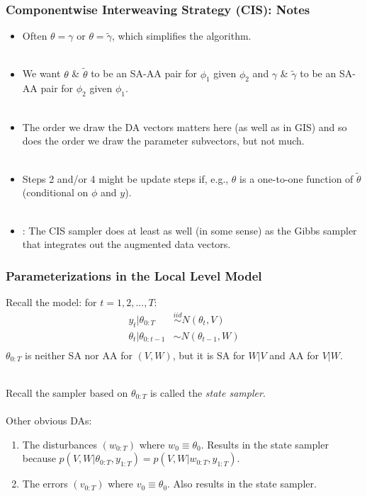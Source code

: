 \documentclass[xcolor=dvipsnames]{beamer}\usepackage{graphicx, color}
\begin{document}
\begin{frame}
  \frametitle{Componentwise Interweaving Strategy (CIS): Notes}
\begin{itemize}
  \item Often $\theta=\gamma$ or $\theta=\tilde{\gamma}$, which simplifies the algorithm.\\~\\
  \item We want $\theta$ \& $\tilde{\theta}$ to be an SA-AA pair for $\phi_1$ given $\phi_2$ and $\gamma$ \& $\tilde{\gamma}$ to be an SA-AA pair for $\phi_2$ given $\phi_1$.\\~\\
  \item The order we draw the DA vectors matters here (as well as in GIS) and so does the order we draw the parameter subvectors, but not much.\\~\\
  \item Steps 2 and/or 4 might be update steps if, e.g., $\theta$ is a one-to-one function of $\tilde{\theta}$ (conditional on $\phi$ and $y$).\\~\\
  \item \citet{yu2011center}: The CIS sampler does at least as well (in some sense) as the Gibbs sampler that integrates out the augmented data vectors.
\end{itemize}
\end{frame}

\begin{frame}
  \frametitle{Parameterizations in the Local Level Model}
Recall the model: for $t=1,2,...,T$:
\begin{align*}
  y_t|\theta_{0:T} &\stackrel{iid}{\sim} N(\theta_t,V)\\
  \theta_t|\theta_{0:t-1} &\sim N(\theta_{t-1},W)\\
\end{align*}
$\theta_{0:T}$ is neither SA nor AA for $(V,W)$, but it is SA for $W|V$ and AA for $V|W$.\\~\\\pause

Recall the sampler based on $\theta_{0:T}$ is called the {\it \color{red} state sampler}.\\~\\

Other obvious DAs: 
\begin{enumerate}
  \item The disturbances $(w_{0:T})$ where $w_0\equiv \theta_0$. Results in the state sampler because $p(V,W|\theta_{0:T},y_{1:T})=p(V,W|w_{0:T},y_{1:T})$.
  \item The errors $(v_{0:T})$ where $v_0\equiv \theta_0$. Also results in the state sampler.
\end{enumerate}
\end{frame}
\end{document}
